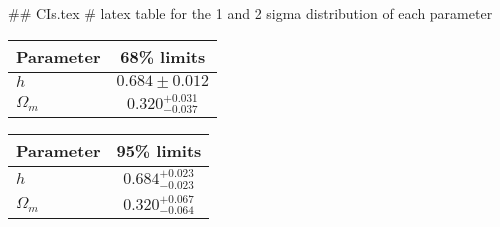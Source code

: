 ## CIs.tex
# latex table for the 1 and 2 sigma distribution of each parameter

\begin{tabular} { l  c}
 Parameter &  68\% limits\\
\hline
{\boldmath$h              $} & $0.684\pm 0.012            $\\
{\boldmath$\Omega_m       $} & $0.320^{+0.031}_{-0.037}   $\\
\hline
\end{tabular}

\begin{tabular} { l  c}
 Parameter &  95\% limits\\
\hline
{\boldmath$h              $} & $0.684^{+0.023}_{-0.023}   $\\
{\boldmath$\Omega_m       $} & $0.320^{+0.067}_{-0.064}   $\\
\hline
\end{tabular}
